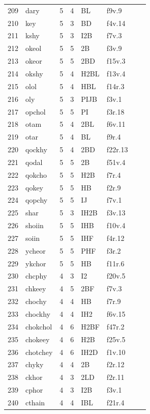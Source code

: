 \documentclass[11pt,a4paper]{article}
\begin{document}
\begin{landscape}
\begin{longtable}{@{}r>{\ttfamily}lrrl>{\ttfamily}l>{\raggedright\arraybackslash}p{80mm}>{\raggedright\arraybackslash}p{36mm}@{}}
209 & dary & 5 & 4 & BL & f9v.9 &  & \\
210 & key & 5 & 3 & BD & f4v.14 &  & \\
211 & kshy & 5 & 3 & I2B & f7v.3 &  & \\
212 & okeol & 5 & 5 & 2B & f3v.9 &  & \\
213 & okeor & 5 & 5 & 2BD & f15v.3 &  & \\
214 & okshy & 5 & 4 & H2BL & f13v.4 &  & \\
215 & olol & 5 & 4 & HBL & f14r.3 &  & \\
216 & oly & 5 & 3 & PIJB & f3v.1 &  & \\
217 & opchol & 5 & 5 & PI & f3r.18 &  & \\
218 & otam & 5 & 4 & 2BL & f6v.11 &  & \\
219 & otar & 5 & 4 & BL & f9r.4 &  & \\
220 & qockhy & 5 & 4 & 2BD & f22r.13 &  & \\
221 & qodal & 5 & 5 & 2B & f51v.4 &  & \\
222 & qokcho & 5 & 5 & H2B & f7r.4 &  & \\
223 & qokey & 5 & 5 & HB & f2r.9 &  & \\
224 & qopchy & 5 & 5 & IJ & f7v.1 &  & \\
225 & shar & 5 & 3 & IH2B & f3v.13 &  & \\
226 & shoiin & 5 & 5 & IHB & f10v.4 &  & \\
227 & soiin & 5 & 5 & IHF & f4r.12 &  & \\
228 & ycheor & 5 & 5 & PHF & f3r.2 &  & \\
229 & ykchor & 5 & 5 & HB & f11r.6 &  & \\
230 & chcphy & 4 & 3 & I2 & f20v.5 &  & \\
231 & chkeey & 4 & 5 & 2BF & f7v.3 &  & \\
232 & chochy & 4 & 4 & HB & f7r.9 &  & \\
233 & chockhy & 4 & 4 & IH2 & f6v.15 &  & \\
234 & chokchol & 4 & 6 & H2BF & f47r.2 &  & \\
235 & chokeey & 4 & 6 & H2B & f25v.5 &  & \\
236 & chotchey & 4 & 6 & IH2D & f1v.10 &  & \\
237 & chyky & 4 & 4 & 2B & f2r.12 &  & \\
238 & ckhor & 4 & 3 & 2LD & f2r.11 &  & \\
239 & cphor & 4 & 3 & I2B & f3v.1 &  & \\
240 & cthain & 4 & 4 & IBL & f21r.4 &  & \\

\end{longtable}
\end{landscape}
\end{document}
